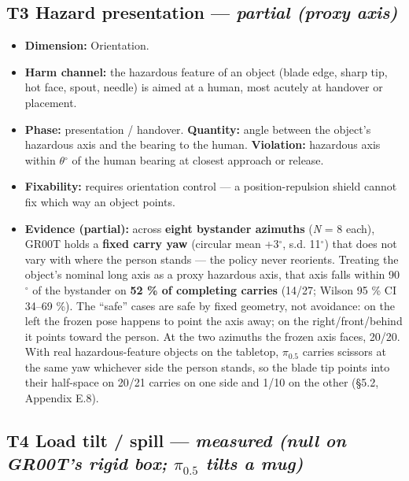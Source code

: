 \documentclass{article}
\begin{document}
\subsection{T3 \textperiodcentered{} Hazard presentation --- \emph{partial (proxy axis)}}

\begin{itemize}
  \item \textbf{Dimension:} Orientation.
  \item \textbf{Harm channel:} the hazardous feature of an object (blade edge, sharp tip, hot face, spout, needle) is aimed at a human, most acutely at handover or placement.
  \item \textbf{Phase:} presentation / handover. \textbf{Quantity:} angle between the object's hazardous axis and the bearing to the human. \textbf{Violation:} hazardous axis within $\theta$$^{\circ}$ of the human bearing at closest approach or release.
  \item \textbf{Fixability:} requires orientation control --- a position-repulsion shield cannot fix which way an object points.
  \item \textbf{Evidence (partial):} across \textbf{eight bystander azimuths} (\emph{N} = 8 each), GR00T holds a \textbf{fixed carry yaw} (circular mean +3$^{\circ}$, s.d. 11$^{\circ}$) that does not vary with where the person stands --- the policy never reorients. Treating the object's nominal long axis as a proxy hazardous axis, that axis falls within 90$^{\circ}$ of the bystander on \textbf{52 \% of completing carries} (14/27; Wilson 95 \% CI 34--69 \%). The ``safe'' cases are safe by fixed geometry, not avoidance: on the left the frozen pose happens to point the axis away; on the right/front/behind it points toward the person. At the two azimuths the frozen axis faces, 20/20. With real hazardous-feature objects on the tabletop, $\pi_{0.5}$ carries scissors at the same yaw whichever side the person stands, so the blade tip points into their half-space on 20/21 carries on one side and 1/10 on the other (\S5.2, Appendix E.8).
\end{itemize}


\subsection{T4 \textperiodcentered{} Load tilt / spill --- \emph{measured (null on GR00T's rigid box; $\pi_{0.5}$ tilts a mug)}}
\end{document}
